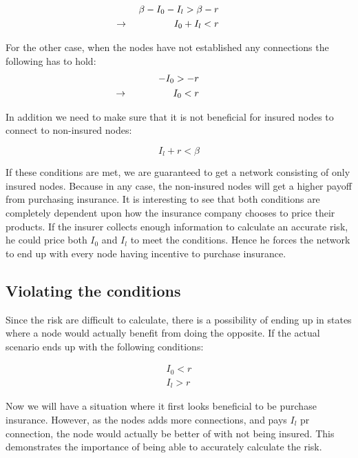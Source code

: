 \begin{eqnarray}
\beta - I_{0} - I_{l} > \beta - r \nonumber \\ 
\llap{$\rightarrow$\hspace{50pt}}  I_{0} + I_{l} < r 
\label{eq:model2extention:1}
\end{eqnarray}

For the other case, when the nodes have not established any connections the following has to hold: 
\begin{eqnarray}
 - I_{0} > -r \nonumber \\ 
\llap{$\rightarrow$\hspace{50pt}}  I_{0} < r 
\label{eq:model2extention:2}
\end{eqnarray}

In addition we need to make sure that it is not beneficial for insured nodes to connect to non-insured nodes: 

\begin{equation}
I_{l}+r < \beta
\end{equation}

If these conditions are met, we are guaranteed to get a network consisting of only insured nodes. Because in any case, the non-insured nodes will get a higher payoff from purchasing insurance. It is interesting to see that both conditions are completely dependent upon how the insurance company chooses to price their products. If the insurer collects enough information to calculate an accurate risk, he could price both $I_{0}$ and $I_{l}$ to meet the conditions. Hence he forces the network to end up with every node having incentive to purchase insurance.

\subsection{Violating the conditions} 
Since the risk are difficult to calculate, there is a possibility of ending up in states where a node would actually benefit from doing the opposite. If the actual scenario ends up with the following conditions: 


\begin{eqnarray}
I_{0}< r \nonumber \\ 
I_{l}> r
\label{eq:model2extention:3}
\end{eqnarray}

Now we will have a situation where it first looks beneficial to be purchase insurance. However, as the nodes adds more connections, and pays $I_{l}$ pr connection, the node would actually be better of with not being insured. This demonstrates the importance of being able to accurately calculate the risk. 



